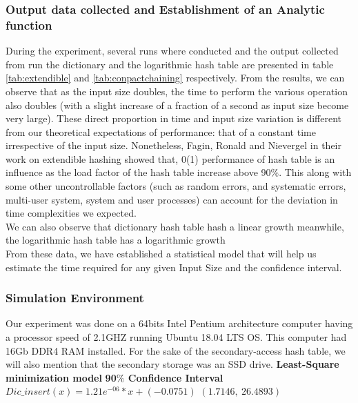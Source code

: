 \documentclass[a4paper,12pt, openany]{book}
\begin{document}
\subsubsection{Output data collected and Establishment of an Analytic function}
During the experiment, several runs where conducted and the output collected from run the dictionary and the logarithmic hash table are presented in table \ref{tab:extendible} and \ref{tab:conpactchaining} respectively. From the results, we can observe that as the input size doubles, the time to perform the various operation also doubles (with a slight increase of a fraction of a second as input size become very large). These direct proportion in time and input size variation is different from our theoretical expectations of performance: that of a constant time irrespective of the input size. Nonetheless, Fagin, Ronald and Nievergel \cite{article} in their work on extendible hashing showed that, 0(1) performance of hash table is an influence as the load factor of the hash table increase above 90$\%$. This along with some other uncontrollable factors (such as random errors, and systematic errors, multi-user system, system and user processes) can account for the deviation in time complexities we expected.\\
We can also observe that dictionary hash table hash a linear growth meanwhile, the logarithmic hash table has a logarithmic growth  \\
From these data, we have established a statistical model that will help us estimate the time required for any given Input Size and the confidence interval.\\

\subsubsection{Simulation Environment}
Our experiment was done on a 64bits Intel Pentium architecture computer having a processor speed of 2.1GHZ running Ubuntu 18.04 LTS OS. This computer had 16Gb DDR4 RAM installed. For the sake of the secondary-access hash table, we will also mention that the secondary storage was an SSD drive.  \bigbreak
	\textbf{Least-Square minimization model}\hspace{1.2in} \textbf{90$\%$ Confidence Interval}\\
	
		$	    Dic\_insert(x) = 1.21e^{-06}*x + (-0.0751) $ \hspace{.95in} $(1.7146, \ 26.4893)$
	
\end{document}
